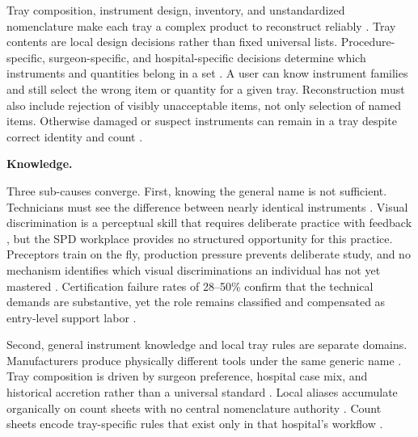 \documentclass[10pt,a4paper]{article}
\begin{document}
Tray composition, instrument design, inventory, and unstandardized nomenclature
make each tray a complex product to reconstruct reliably
\cite{alfred-et-al-2021}. Tray contents are local design decisions rather than
fixed universal lists. Procedure-specific, surgeon-specific, and
hospital-specific decisions determine which instruments and quantities belong in
a set \cite{dos-santos-et-al-2021, ahmadi-et-al-2023}. A user can know
instrument families and still select the wrong item or quantity for a given
tray. Reconstruction must also include rejection of visibly unacceptable items,
not only selection of named items. Otherwise damaged or suspect instruments can
remain in a tray despite correct identity and count
\cite{cdc, cdc-healthcare-equipment-accessed-2026, cdc-environmental-surfaces-accessed-2026, steris-cleaning-instruments-accessed-2026, public-health-ontario-2013, pennsylvania-patient-safety-authority-2006, medline-custom-trays-2025, medline-transport-2026}.

\textbf{Knowledge.}

Three sub-causes converge. First, knowing the general name is not sufficient.
Technicians must see the difference between nearly identical instruments
\cite{castillo-gutierrez-2025, nichol-et-al-2024}. Visual discrimination is
a perceptual skill that requires deliberate practice with feedback
\cite{fast-et-al-2019, shreckengost-et-al-2022}, but the SPD workplace
provides no structured opportunity for this practice. Preceptors train on the
fly, production pressure prevents deliberate study, and no mechanism identifies
which visual discriminations an individual has not yet mastered
\cite{nichol-et-al-2024, alfred-et-al-2021}. Certification failure rates of
28--50\% confirm that the technical demands are substantive, yet the role
remains classified and compensated as entry-level support labor
\cite{hspa-crcst-accessed-2026, hspa-crcst-content-outline-2023, hspa-urology-instruments-accessed-2026}.

Second, general instrument knowledge and local tray rules are separate domains.
Manufacturers produce physically different tools under the same generic name
\cite{nadeau-2024}. Tray composition is driven by surgeon preference, hospital
case mix, and historical accretion rather than a universal standard
\cite{dos-santos-et-al-2021, ahmadi-et-al-2023}. Local aliases accumulate
organically on count sheets with no central nomenclature authority
\cite{alfred-et-al-2021}. Count sheets encode tray-specific rules that exist
only in that hospital's workflow \cite{nadeau-2024, purdue-count-sheets-accessed-2026}.
\end{document}
